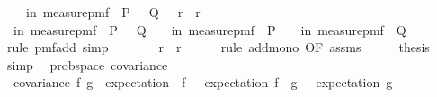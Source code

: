 \begin{isabellebody}
\ \ \ {\isachardoublequoteopen}{\isasymP}{\isacharparenleft}{\kern0pt}{\isasymomega}\ in\ measure{\isacharunderscore}{\kern0pt}pmf\ {\isasymOmega}{\isachardot}{\kern0pt}\ P\ {\isasymomega}\ {\isasymor}\ Q\ {\isasymomega}{\isacharparenright}{\kern0pt}\ {\isasymle}\ r{}\ {\isacharplus}{\kern0pt}\ r{}{\isachardoublequoteclose}\isanewline
%
\isadelimproof
%
\endisadelimproof
%
\isatagproof
{}\isamarkupfalse%
\ {\isacharminus}{\kern0pt}\isanewline
\ \ \isamarkupfalse%
\ {\isachardoublequoteopen}{\isasymP}{\isacharparenleft}{\kern0pt}{\isasymomega}\ in\ measure{\isacharunderscore}{\kern0pt}pmf\ {\isasymOmega}{\isachardot}{\kern0pt}\ P\ {\isasymomega}\ {\isasymor}\ Q\ {\isasymomega}{\isacharparenright}{\kern0pt}\ {\isasymle}\ {\isasymP}{\isacharparenleft}{\kern0pt}{\isasymomega}\ in\ measure{\isacharunderscore}{\kern0pt}pmf\ {\isasymOmega}{\isachardot}{\kern0pt}\ P\ {\isasymomega}{\isacharparenright}{\kern0pt}\ {\isacharplus}{\kern0pt}\ {\isasymP}{\isacharparenleft}{\kern0pt}{\isasymomega}\ in\ measure{\isacharunderscore}{\kern0pt}pmf\ {\isasymOmega}{\isachardot}{\kern0pt}\ Q\ {\isasymomega}{\isacharparenright}{\kern0pt}{\isachardoublequoteclose}\isanewline
\ \ \ \ \isamarkupfalse%
\ {\isacharparenleft}{\kern0pt}rule\ pmf{\isacharunderscore}{\kern0pt}add{\isacharcomma}{\kern0pt}\ simp{\isacharparenright}{\kern0pt}\isanewline
\ \ \isamarkupfalse%
\ \isamarkupfalse%
\ {\isachardoublequoteopen}{\isachardot}{\kern0pt}{\isachardot}{\kern0pt}{\isachardot}{\kern0pt}\ {\isasymle}\ r{}\ {\isacharplus}{\kern0pt}\ r{}{\isachardoublequoteclose}\isanewline
\ \ \ \ \isamarkupfalse%
\ {\isacharparenleft}{\kern0pt}rule\ add{\isacharunderscore}{\kern0pt}mono\ {\isacharbrackleft}{\kern0pt}OF\ assms{\isacharbrackright}{\kern0pt}{\isacharparenright}{\kern0pt}\isanewline
\ \ \isamarkupfalse%
\ \isamarkupfalse%
\ {\isacharquery}{\kern0pt}thesis\ \isamarkupfalse%
\ simp\isanewline
{}\isamarkupfalse%
%
\endisatagproof
{\isafoldproof}%
%
\isadelimproof
\isanewline
%
\endisadelimproof
\isanewline
{}\isamarkupfalse%
\ {\isacharparenleft}{\kern0pt}\ prob{\isacharunderscore}{\kern0pt}space{\isacharparenright}{\kern0pt}\ covariance\ \ \isanewline
\ \ {\isachardoublequoteopen}covariance\ f\ g\ {\isacharequal}{\kern0pt}\ expectation\ {\isacharparenleft}{\kern0pt}{\isasymlambda}{\isasymomega}{\isachardot}{\kern0pt}\ {\isacharparenleft}{\kern0pt}f\ {\isasymomega}\ {\isacharminus}{\kern0pt}\ expectation\ f{\isacharparenright}{\kern0pt}\ {\isacharasterisk}{\kern0pt}\ {\isacharparenleft}{\kern0pt}g\ {\isasymomega}\ {\isacharminus}{\kern0pt}\ expectation\ g{\isacharparenright}{\kern0pt}{\isacharparenright}{\kern0pt}{\isachardoublequoteclose}\isanewline

\end{isabellebody}
